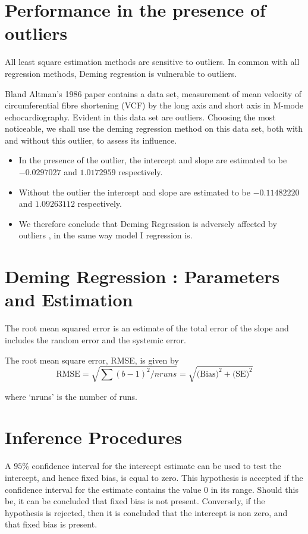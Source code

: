 \documentclass[12pt, a4paper]{report}
\theoremstyle{plain}
\theoremstyle{definition}
\theoremstyle{remark}
\begin{document}
\section{Performance in the presence of outliers}
All least square estimation methods are sensitive to outliers.
In common with all regression methods, Deming regression is vulnerable to outliers. 

Bland Altman's 1986 paper contains a data set, measurement of mean velocity of circumferential fibre shortening (VCF) by the long axis and short axis in M-mode echocardiography. Evident in this data set are outliers. Choosing the most noticeable, we shall use the deming regression method on this data set, both with and
without this outlier, to assess its influence.
\begin{itemize}
	\item In the presence of the outlier, the intercept and slope are estimated to be $-0.0297027$ and $1.0172959$ respectively.
	\item Without the outlier the intercept and slope are estimated to be
	$-0.11482220$ and  $1.09263112$ respectively.
	\item We therefore conclude that Deming Regression is adversely affected
	by outliers , in the same way model I regression is.
\end{itemize}



\section{Deming Regression : Parameters and Estimation}

The root mean squared error is an estimate of the total error of the slope and includes the random error and the systemic error.

The root mean square error, RMSE,  is given by
\begin{equation*}
	\mbox{RMSE} = \sqrt{\sum{(b-1)^2/nruns}} =
	\sqrt{\mbox{(Bias)}^{2}+ \mbox{(SE)}^{2}}
\end{equation*}

where `nruns' is the number of runs.



\section{Inference Procedures}
A $95\%$ confidence interval for the intercept estimate can be used to test the intercept, and hence fixed bias, is equal to
zero. This hypothesis is accepted if the confidence interval for the estimate contains the value $0$ in its range. Should this be,
it can be concluded that fixed bias is not present. Conversely, if the hypothesis is rejected, then it is concluded that the
intercept is non zero, and that fixed bias is present.
\end{document}
